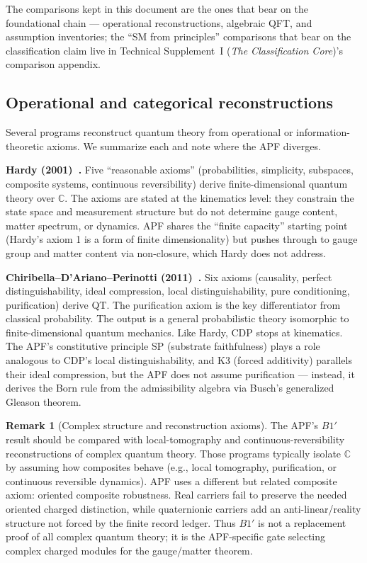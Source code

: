 \documentclass[11pt]{article}
\theoremstyle{definition}
\newtheorem{remark}[theorem]{Remark}
\newcommand{\TSI}{Technical Supplement~I (\emph{The Classification Core})}
\begin{document}
The comparisons kept in this document are the ones that bear on the
foundational chain --- operational reconstructions, algebraic QFT, and
assumption inventories; the ``SM from principles'' comparisons that
bear on the classification claim live in \TSI's comparison appendix.

\subsection{Operational and categorical reconstructions}
\label{sec:op_reconstructions}

Several programs reconstruct quantum theory from operational or
information-theoretic axioms.  We summarize each and note where the
APF diverges.

\smallskip\noindent\textbf{Hardy (2001)~\cite{Hardy2001}.}\quad
Five ``reasonable axioms'' (probabilities, simplicity, subspaces,
composite systems, continuous reversibility) derive finite-dimensional
quantum theory over $\mathbb{C}$.  The axioms are stated at the
kinematics level: they constrain the state space and measurement
structure but do not determine gauge content, matter spectrum, or
dynamics.  APF shares the ``finite capacity'' starting point
(Hardy's axiom 1 is a form of finite dimensionality) but pushes
through to gauge group and matter content via non-closure, which
Hardy does not address.

\smallskip\noindent\textbf{Chiribella--D'Ariano--Perinotti
(2011)~\cite{CDP2011}.}\quad
Six axioms (causality, perfect distinguishability, ideal compression,
local distinguishability, pure conditioning, purification) derive QT.
The purification axiom is the key differentiator from classical
probability.  The output is a general probabilistic theory isomorphic
to finite-dimensional quantum mechanics.  Like Hardy, CDP stops at
kinematics.  The APF's constitutive principle SP (substrate faithfulness)
plays a role analogous to CDP's local distinguishability, and K3
(forced additivity) parallels their ideal compression, but the APF
does not assume purification --- instead, it derives the Born rule
from the admissibility algebra via Busch's generalized Gleason theorem.


\begin{remark}[Complex structure and reconstruction axioms]
\label{rem:complex_reconstruction_v34}
The APF's $B1'$ result should be compared with local-tomography and
continuous-reversibility reconstructions of complex quantum theory.  Those
programs typically isolate $\mathbb C$ by assuming how composites behave
(e.g., local tomography, purification, or continuous reversible dynamics).  APF
uses a different but related composite axiom: oriented composite robustness.
Real carriers fail to preserve the needed oriented charged distinction, while
quaternionic carriers add an anti-linear/reality structure not forced by the
finite record ledger.  Thus $B1'$ is not a replacement proof of all complex
quantum theory; it is the APF-specific gate selecting complex charged modules
for the gauge/matter theorem.
\end{remark}
\end{document}
